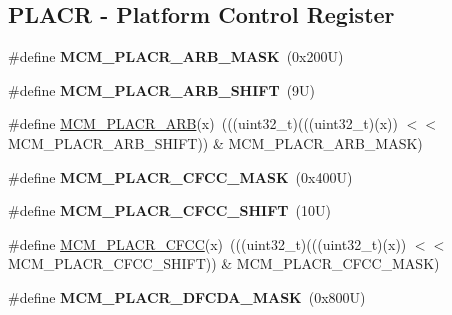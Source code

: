 \subsection*{P\+L\+A\+CR -\/ Platform Control Register}
\begin{DoxyCompactItemize}
\item 
\mbox{\label{group___m_c_m___register___masks_gaeea6e96c143304d5bb05ea7fc403efc3}} 
\#define {\bfseries M\+C\+M\+\_\+\+P\+L\+A\+C\+R\+\_\+\+A\+R\+B\+\_\+\+M\+A\+SK}~(0x200\+U)
\item 
\mbox{\label{group___m_c_m___register___masks_ga074aa7cf18e97a20994af9c9f1151873}} 
\#define {\bfseries M\+C\+M\+\_\+\+P\+L\+A\+C\+R\+\_\+\+A\+R\+B\+\_\+\+S\+H\+I\+FT}~(9\+U)
\item 
\#define \mbox{\hyperlink{group___m_c_m___register___masks_gad4c82e8cda84e63613df6140b5eddcfa}{M\+C\+M\+\_\+\+P\+L\+A\+C\+R\+\_\+\+A\+RB}}(x)~(((uint32\+\_\+t)(((uint32\+\_\+t)(x)) $<$$<$ M\+C\+M\+\_\+\+P\+L\+A\+C\+R\+\_\+\+A\+R\+B\+\_\+\+S\+H\+I\+FT)) \& M\+C\+M\+\_\+\+P\+L\+A\+C\+R\+\_\+\+A\+R\+B\+\_\+\+M\+A\+SK)
\item 
\mbox{\label{group___m_c_m___register___masks_gacbfd3b84d50859b667b4c8c8923893c6}} 
\#define {\bfseries M\+C\+M\+\_\+\+P\+L\+A\+C\+R\+\_\+\+C\+F\+C\+C\+\_\+\+M\+A\+SK}~(0x400\+U)
\item 
\mbox{\label{group___m_c_m___register___masks_ga278b7f999d641bc9c3ab1c7c6d28e8cb}} 
\#define {\bfseries M\+C\+M\+\_\+\+P\+L\+A\+C\+R\+\_\+\+C\+F\+C\+C\+\_\+\+S\+H\+I\+FT}~(10\+U)
\item 
\#define \mbox{\hyperlink{group___m_c_m___register___masks_ga0bc908e2e311d482e30aaec5614e39f7}{M\+C\+M\+\_\+\+P\+L\+A\+C\+R\+\_\+\+C\+F\+CC}}(x)~(((uint32\+\_\+t)(((uint32\+\_\+t)(x)) $<$$<$ M\+C\+M\+\_\+\+P\+L\+A\+C\+R\+\_\+\+C\+F\+C\+C\+\_\+\+S\+H\+I\+FT)) \& M\+C\+M\+\_\+\+P\+L\+A\+C\+R\+\_\+\+C\+F\+C\+C\+\_\+\+M\+A\+SK)
\item 
\mbox{\label{group___m_c_m___register___masks_gae6459088afbbf9bcb5bf4e5eb88f239c}} 
\#define {\bfseries M\+C\+M\+\_\+\+P\+L\+A\+C\+R\+\_\+\+D\+F\+C\+D\+A\+\_\+\+M\+A\+SK}~(0x800\+U)
\item 
\mbox{\label{group___m_c_m___register___masks_ga9834def64562d8851ba0500d81ae2a16}} 

\end{DoxyCompactItemize}
